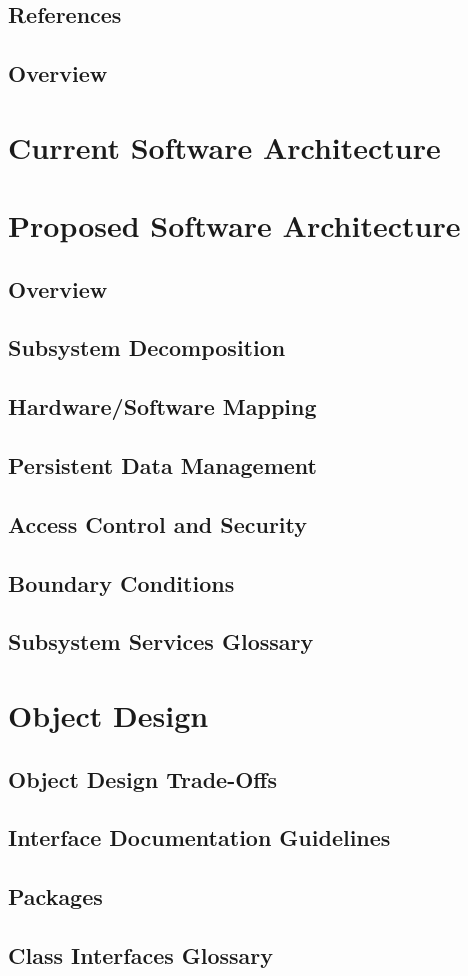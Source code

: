 \documentclass[a4paper,12pt]{report}
\begin{document}
		\section{References}
		\section{Overview}
	\chapter{Current Software Architecture}
	\chapter{Proposed Software Architecture}
		\section{Overview}
		\section{Subsystem Decomposition}
		\section{Hardware/Software Mapping}
		\section{Persistent Data Management}
		\section{Access Control and Security}
		\section{Boundary Conditions}
		\section{Subsystem Services Glossary}
	\chapter{Object Design}
		\section{Object Design Trade-Offs}
		\section{Interface Documentation Guidelines}
		\section{Packages}
		\section{Class Interfaces Glossary}
\end{document}
